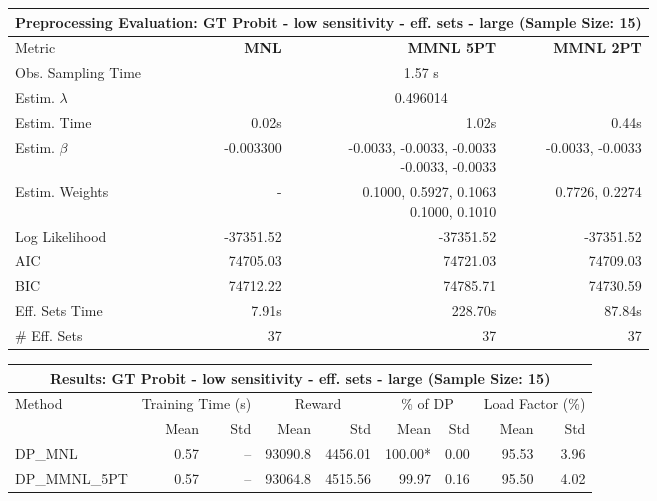
\begin{samepage}
\begin{center}
  \small
  \begin{tabular}{l|r|r|r}
    \toprule
    \multicolumn{4}{c}{\textbf{Preprocessing Evaluation: GT Probit - low sensitivity - eff. sets - large (Sample Size: 15)}} \\
    \midrule
    Metric & \textbf{MNL} & \textbf{MMNL 5PT} & \textbf{MMNL 2PT} \\
    \midrule
    Obs. Sampling Time & \multicolumn{3}{c}{1.57 s} \\
    Estim. $\lambda$ & \multicolumn{3}{c}{0.496014} \\
    Estim. Time & 0.02s & 1.02s & 0.44s \\
    Estim. $\beta$ & -0.003300 & \makecell[tr]{-0.0033, -0.0033, -0.0033 \\ -0.0033, -0.0033} & -0.0033, -0.0033 \\
    Estim. Weights & - & \makecell[tr]{0.1000, 0.5927, 0.1063 \\ 0.1000, 0.1010} & 0.7726, 0.2274 \\
    Log Likelihood & -37351.52 & -37351.52 & -37351.52 \\
    AIC & 74705.03 & 74721.03 & 74709.03 \\
    BIC & 74712.22 & 74785.71 & 74730.59 \\
    Eff. Sets Time & 7.91s & 228.70s & 87.84s \\
    \# Eff. Sets & 37 & 37 & 37 \\
    \bottomrule
  \end{tabular}
\end{center}
\begin{center}
  \small
  \begin{tabular}{l|rr|rr|rr|rr}
    \toprule
    \multicolumn{9}{c}{\textbf{Results: GT Probit - low sensitivity - eff. sets - large (Sample Size: 15)}} \\
    \midrule
    Method & \multicolumn{2}{c|}{Training Time (s)} & \multicolumn{2}{c|}{Reward} & \multicolumn{2}{c|}{\% of DP} & \multicolumn{2}{c}{Load Factor (\%)} \\
    & Mean & Std & Mean & Std & Mean & Std & Mean & Std \\
    \midrule
    DP\_MNL      &     0.57 &    -- &    93090.8 &    4456.01 & 100.00* &    0.00 &   95.53 &    3.96 \\
    DP\_MMNL\_5PT &     0.57 &    -- &    93064.8 &    4515.56 &   99.97 &    0.16 &   95.50 &    4.02 \\

\end{tabular}
\end{center}
\end{samepage}
